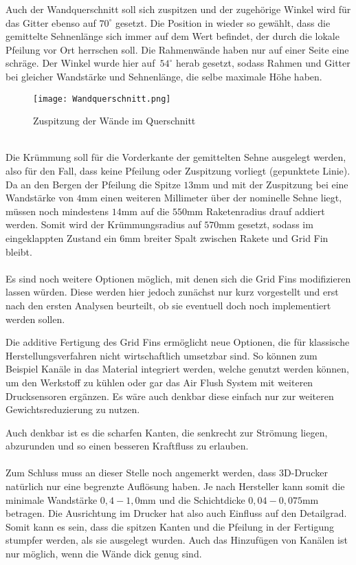 Auch der Wandquerschnitt soll sich zuspitzen und der zugehörige Winkel wird für das Gitter ebenso auf $70^\circ$ gesetzt. Die Position in wieder so gewählt, dass die gemittelte Sehnenlänge sich immer auf dem Wert befindet, der durch die lokale Pfeilung vor Ort herrschen soll. Die Rahmenwände haben nur auf einer Seite eine schräge. Der Winkel wurde hier auf\ $54^\circ$ herab gesetzt, sodass Rahmen und Gitter bei gleicher Wandstärke und Sehnenlänge, die selbe maximale Höhe haben.
\begin{figure}
	\centering
	\texttt{[image: Wandquerschnitt.png]}
	\caption{Zuspitzung der Wände im Querschnitt}
\end{figure}\\
Die Krümmung soll für die Vorderkante der gemittelten Sehne ausgelegt werden, also für den Fall, dass keine Pfeilung oder Zuspitzung vorliegt (gepunktete Linie). Da an den Bergen der Pfeilung die Spitze $13$mm und mit der Zuspitzung bei eine Wandstärke von $4$mm einen weiteren Millimeter über der nominelle Sehne liegt, müssen noch mindestens $14$mm auf die $550$mm Raketenradius drauf addiert werden. Somit wird der Krümmungsradius auf $570$mm gesetzt, sodass im eingeklappten Zustand ein $6$mm breiter Spalt zwischen Rakete und Grid Fin bleibt.
\\~\\
Es sind noch weitere Optionen möglich, mit denen sich die Grid Fins modifizieren lassen würden. Diese werden hier jedoch zunächst nur kurz vorgestellt und erst nach den ersten Analysen beurteilt, ob sie eventuell doch noch implementiert werden sollen.

Die additive Fertigung des Grid Fins ermöglicht neue Optionen, die für klassische Herstellungsverfahren nicht wirtschaftlich umsetzbar sind. So können zum Beispiel Kanäle in das Material integriert werden, welche genutzt werden können, um den Werkstoff zu kühlen oder gar das Air Flush System mit weiteren Drucksensoren ergänzen. Es wäre auch denkbar diese einfach nur zur weiteren Gewichtsreduzierung zu nutzen.

Auch denkbar ist es die scharfen Kanten, die senkrecht zur Strömung liegen, abzurunden und so einen besseren Kraftfluss zu erlauben.
\\~\\
Zum Schluss muss an dieser Stelle noch angemerkt werden, dass 3D-Drucker natürlich nur eine begrenzte Auflösung haben. Je nach Hersteller kann somit die minimale Wandstärke $0,4-1,0$mm \cite{eos, preise} und die Schichtdicke $0,04-0,075$mm \cite{preise} betragen. Die Ausrichtung im Drucker hat also auch Einfluss auf den Detailgrad. Somit kann es sein, dass die spitzen Kanten und die Pfeilung in der Fertigung stumpfer werden, als sie ausgelegt wurden. Auch das Hinzufügen von Kanälen ist nur möglich, wenn die Wände dick genug sind.
